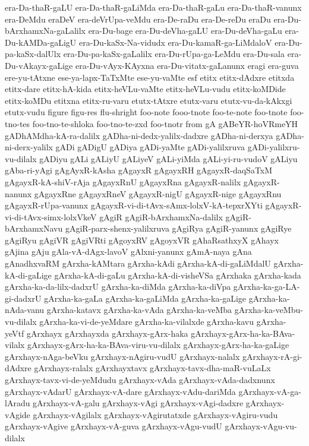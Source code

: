 {era-Da-thaR-gaLU
era-Da-thaR-gaLiMda
era-Da-thaR-gaLu
era-Da-thaR-vanunx
era-DeMdu
eraDeV
era-deVrUpa-veMdu
era-De-raDu
era-De-reDu
eraDu
era-Du-bArxhamxNa-gaLalilx
era-Du-bage
era-Du-deVha-gaLU
era-Du-deVha-gaLu
era-Du-kAMDa-gaLigU
era-Du-kaSx-Na-vidudx
era-Du-kamaR-ga-LiMdaloV
era-Du-pa-kaSx-dalUlx
era-Du-pa-kaSx-gaLalilx
era-Du-rUpa-ga-LeMdu
era-Du-sala
era-Du-vAkayx-gaLige
era-Du-vAyx-KAyxna
era-Du-vitatx-gaLanunx
eragi
era-guva
ere-yu-tAtxne
ese-ya-lapx-TaTxMte
ese-yu-vaMte
esf
etitx
etitx-dAdxre
etitxda
etitx-dare
etitx-hA-kida
etitx-heVLu-vaMte
etitx-heVLu-vudu
etitx-koMDide
etitx-koMDu
etitxna
etitx-ru-varu
etutx-tAtxre
etutx-varu
etutx-vu-da-kAkxgi
etutx-vudu
figure
figu-res
flu-shright
foo-note
fooo-tnote
foo-te-note
foo-tnote
foo-tno-tes
foo-tno-te-shloka
foo-tno-te-zxd
foo-tnotr
from
gA
gABeYR-hoVRmeYH
gADhAMdha-kA-ra-dalilx
gADha-ni-dedx-yalilx-dadxre
gADha-ni-derxya
gADha-ni-derx-yalilx
gADi
gADigU
gADiya
gADi-yaMte
gADi-yalilxruva
gADi-yalilxru-vu-dilalx
gADiyu
gALi
gALiyU
gALiyeV
gALi-yiMda
gALi-yi-ru-vudoV
gALiyu
gAba-ri-yAgi
gAgAyxR-kAsha
gAgayxR
gAgayxRH
gAgayxR-daqSaTxM
gAgayxR-kA-shiV-rAja
gAgayxRnU
gAgayxRna
gAgayxR-nalilx
gAgayxR-nanunx
gAgayxRne
gAgayxRneV
gAgayxR-nigU
gAgayxR-nige
gAgayxRnu
gAgayxR-rUpa-vanunx
gAgayxR-vi-di-tAvx-sAmx-lolxV-kA-tepxrXYti
gAgayxR-vi-di-tAvx-simx-lolxVkeV
gAgiR
gAgiR-bArxhamxNa-dalilx
gAgiR-bArxhamxNavu
gAgiR-parx-shenx-yalilxruva
gAgiRya
gAgiR-yanunx
gAgiRye
gAgiRyu
gAgiVR
gAgiVRti
gAgoyxRV
gAgoyxVR
gAhaRsathxyX
gAhayx
gAjina
gAju
gAla-vA-dAgx-lavoV
gAlxni-yanunx
gAmA-naya
gAna
gAnadhxvaRM
gArxha-kAMtara
gArxha-kAdi
gArxha-kA-di-gaLiMdalU
gArxha-kA-di-gaLige
gArxha-kA-di-gaLu
gArxha-kA-di-visheVSa
gArxhaka
gArxha-kada
gArxha-ka-da-lilx-dadxrU
gArxha-ka-diMda
gArxha-ka-diVpa
gArxha-ka-ga-LA-gi-dadxrU
gArxha-ka-gaLa
gArxha-ka-gaLiMda
gArxha-ka-gaLige
gArxha-ka-nAda-vanu
gArxha-katavx
gArxha-ka-vAda
gArxha-ka-veMba
gArxha-ka-veMbu-vu-dilalx
gArxha-ka-vi-de-yeMdare
gArxha-ka-vilalxde
gArxha-kavu
gArxha-yeVtf
gArxhayx
gArxhayxda
gArxhayx-gArx-haka
gArxhayx-gArx-ha-ka-BAva-vilalx
gArxhayx-gArx-ha-ka-BAva-viru-vu-dilalx
gArxhayx-gArx-ha-ka-gaLige
gArxhayx-nAga-beVku
gArxhayx-nAgiru-vudU
gArxhayx-nalalx
gArxhayx-rA-gi-dAdxre
gArxhayx-ralalx
gArxhayxtavx
gArxhayx-tavx-dha-maR-vuLaLx
gArxhayx-tavx-vi-de-yeMdudu
gArxhayx-vAda
gArxhayx-vAda-dadxnunx
gArxhayx-vAdarU
gArxhayx-vA-dare
gArxhayx-vAdu-dariMda
gArxhayx-vA-ga-lAradu
gArxhayx-vA-galu
gArxhayx-vAgi
gArxhayx-vAgi-dadxre
gArxhayx-vAgide
gArxhayx-vAgilalx
gArxhayx-vAgirutatxde
gArxhayx-vAgiru-vudu
gArxhayx-vAgive
gArxhayx-vA-guva
gArxhayx-vAgu-vudU
gArxhayx-vAgu-vu-dilalx
}

